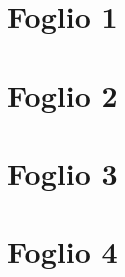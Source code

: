 \documentclass{article}
\begin{document}
\tableofcontents

\newpage

\section{Foglio 1}


\section{Foglio 2}


\section{Foglio 3}


\section{Foglio 4}

\end{document}
